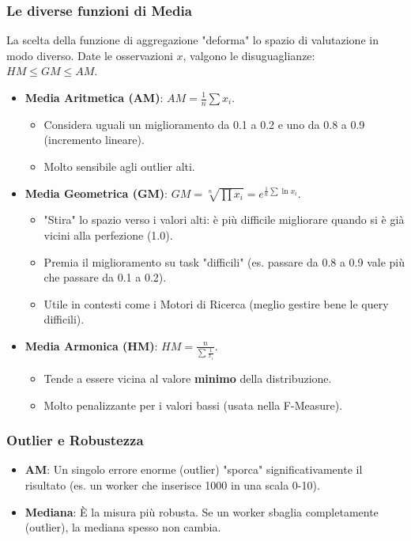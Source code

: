 \documentclass{article}
\begin{document}
    \subsubsection{Le diverse funzioni di Media}
      La scelta della funzione di aggregazione "deforma" lo spazio di valutazione in modo diverso. Date le osservazioni $x$, valgono le disuguaglianze: $HM \le GM \le AM$.
      \begin{itemize}
          \item \textbf{Media Aritmetica (AM)}: $AM = \frac{1}{n}\sum x_i$.
            \begin{itemize}
                \item Considera uguali un miglioramento da 0.1 a 0.2 e uno da 0.8 a 0.9 (incremento lineare).
                \item Molto sensibile agli outlier alti.
            \end{itemize}
          \item \textbf{Media Geometrica (GM)}: $GM = \sqrt[n]{\prod x_i} = e^{\frac{1}{n}\sum \ln x_i}$.
            \begin{itemize}
                \item "Stira" lo spazio verso i valori alti: è più difficile migliorare quando si è già vicini alla perfezione (1.0).
                \item Premia il miglioramento su task "difficili" (es. passare da 0.8 a 0.9 vale più che passare da 0.1 a 0.2).
                \item Utile in contesti come i Motori di Ricerca (meglio gestire bene le query difficili).
            \end{itemize}
          \item \textbf{Media Armonica (HM)}: $HM = \frac{n}{\sum \frac{1}{x_i}}$.
            \begin{itemize}
                \item Tende a essere vicina al valore \textbf{minimo} della distribuzione.
                \item Molto penalizzante per i valori bassi (usata nella F-Measure).
            \end{itemize}
      \end{itemize}
    \subsubsection{Outlier e Robustezza}
      \begin{itemize}
          \item \textbf{AM}: Un singolo errore enorme (outlier) "sporca" significativamente il risultato (es. un worker che inserisce 1000 in una scala 0-10).
          \item \textbf{Mediana}: È la misura più robusta. Se un worker sbaglia completamente (outlier), la mediana spesso non cambia.
      \end{itemize}
\end{document}
